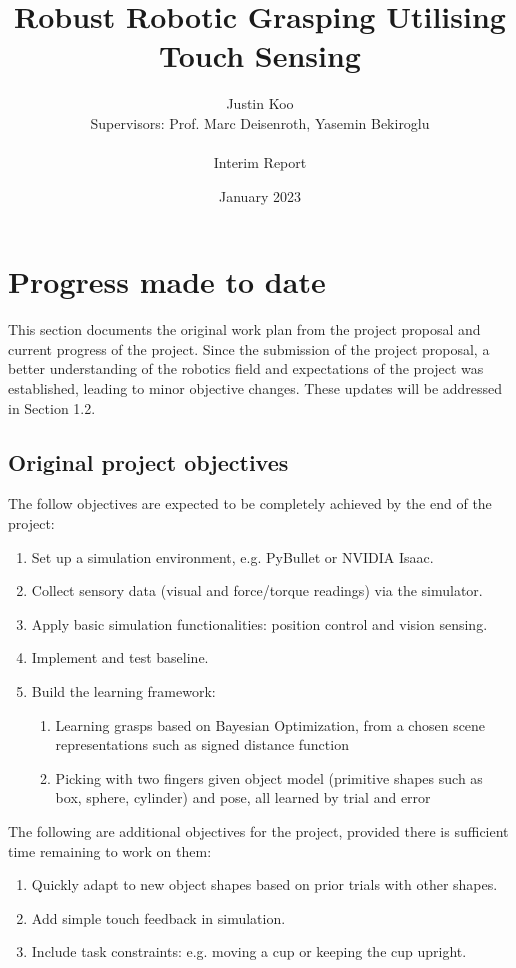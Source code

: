 \documentclass{article}
\title{Robust Robotic Grasping Utilising Touch Sensing}
\author{Justin Koo\\Supervisors: Prof. Marc Deisenroth, Yasemin Bekiroglu\\ \\Interim Report}
\date{January 2023}
\begin{document}
\maketitle

\section{Progress made to date}
This section documents the original work plan from the project proposal and current progress of the project. Since the submission of the project proposal, a better understanding of the robotics field and expectations of the project was established, leading to minor objective changes. These updates will be addressed in Section 1.2.

\subsection{Original project objectives}
The follow objectives are expected to be completely achieved by the end of the project:
\begin{enumerate}
    \item Set up a simulation environment, e.g. PyBullet or NVIDIA Isaac. 
    \item Collect sensory data (visual and force/torque readings) via the simulator.
    \item Apply basic simulation functionalities: position control and vision sensing.
    \item Implement and test baseline.
    \item Build the learning framework:
    \begin{enumerate}
        \item Learning grasps based on Bayesian Optimization, from a chosen scene representations such as signed distance function 
        \item Picking with two fingers given object model (primitive shapes such as box, sphere, cylinder) and pose, all learned by trial and error
    \end{enumerate}
\end{enumerate}

The following are additional objectives for the project, provided there is sufficient time remaining to work on them:
\begin{enumerate}
    \item Quickly adapt to new object shapes based on prior trials with other shapes.
    \item Add simple touch feedback in simulation.
    \item Include task constraints: e.g. moving a cup or keeping the cup upright.
\end{enumerate}
\end{document}
